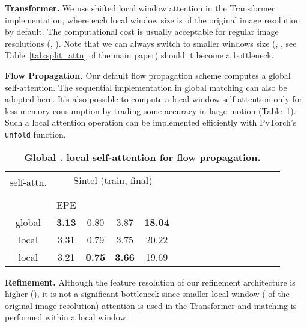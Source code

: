 \documentclass[10pt,twocolumn,letterpaper]{article}
\begin{document}
{\bf Transformer.} We use shifted local window attention \cite{liu2021Swin} in the Transformer implementation, where each local window size is  of the original image resolution by default. The computational cost is usually acceptable for regular image resolutions (\eg, ). Note that we can always switch to smaller windows size (\eg, , see Table~\ref{tab:split_attn} of the main paper) should it become a bottleneck.



{\bf Flow Propagation.} Our default flow propagation scheme computes a global self-attention. The sequential implementation in global matching can also be adopted here. It's also possible to compute a local window self-attention only for less memory consumption by trading some accuracy in large motion (Table~\ref{tab:global_local_prop}). Such a local attention operation can be implemented efficiently with PyTorch's \texttt{unfold} function.



\begin{table}[H]
    \centering
    \setlength{\tabcolsep}{3.pt} \begin{tabular}{cccccccccccccccc}
    \toprule
    
    \multirow{2}{*}[-2pt]{self-attn.} & \multicolumn{4}{c}{Sintel (train, final)}  & \\
    \addlinespace[-12pt] \\
    \cmidrule(lr){2-5} 
    \addlinespace[-12pt] \\
    & EPE &  &  &   \\
    \midrule
    
    global & \textbf{3.13} & 0.80 & 3.87 & \textbf{18.04} \\
    local  & 3.31 & 0.79 & 3.75 & 20.22 \\
    local  & 3.21 & \textbf{0.75} & \textbf{3.66} & 19.69 \\

    \bottomrule
    \end{tabular}
    \vspace{-5pt}
    \caption{\textbf{Global \vs. local self-attention for flow propagation.}
    }
    \label{tab:global_local_prop}
    \vspace{-10pt}
    
\end{table}




{\bf Refinement.} Although the feature resolution of our refinement architecture is higher (), it is not a significant bottleneck since smaller local window ( of the original image resolution) attention is used in the Transformer and matching is performed within a local window.
\end{document}
